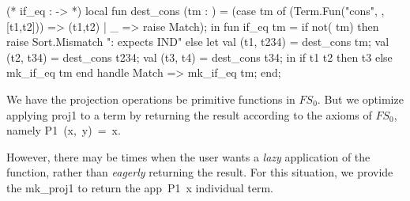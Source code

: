 (* if_eq :  ->  *)
local
  fun dest_cons (tm : ) =
   (case tm of
     (Term.Fun("cons", , [t1,t2])) => (t1,t2)
   | _ => raise Match);
in
fun if_eq tm =
  if not( tm)
  then raise Sort.Mismatch ": expects IND"
  else
    let
      val (t1, t234) = dest_cons tm;
      val (t2, t34) = dest_cons t234;
      val (t3, t4) = dest_cons t34;
    in
      if  t1 t2 then t3
      else mk_if_eq tm
    end
    handle Match => mk_if_eq tm;
end;
\eatline
{}\nwendcode{}\nwdocspar

\begin{node}
We have the projection operations be primitive functions in
$FS_{0}$. But we optimize applying {\Tt{}proj1\nwendquote} to a term by returning
the result according to the axioms of $FS_{0}$, namely {\Tt{}P1\ (x,\ y)\ =\ x\nwendquote}.

However, there may be times when the user wants a \emph{lazy}
application of the function, rather than \emph{eagerly} returning the
result. For this situation, we provide the {\Tt{}mk{\_}proj1\nwendquote} to return the
{\Tt{}app\ P1\ x\nwendquote} individual term.
\end{node}

